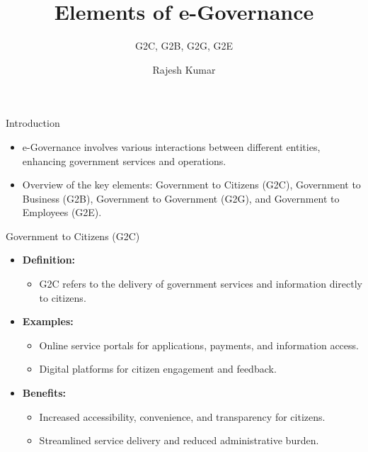 \title{Elements of e-Governance}
\subtitle{G2C, G2B, G2G, G2E}
\author{Rajesh Kumar}
\date{}


\begin{frame}
  \titlepage
\end{frame}

\begin{frame}{Introduction}
  \begin{itemize}
    \item e-Governance involves various interactions between different entities, enhancing government services and operations.
    \item Overview of the key elements: Government to Citizens (G2C), Government to Business (G2B), Government to Government (G2G), and Government to Employees (G2E).
  \end{itemize}
\end{frame}

\begin{frame}{Government to Citizens (G2C)}
  \begin{itemize}
    \item \textbf{Definition:}
      \begin{itemize}
        \item G2C refers to the delivery of government services and information directly to citizens.
      \end{itemize}
    \item \textbf{Examples:}
      \begin{itemize}
        \item Online service portals for applications, payments, and information access.
        \item Digital platforms for citizen engagement and feedback.
      \end{itemize}
    \item \textbf{Benefits:}
      \begin{itemize}
        \item Increased accessibility, convenience, and transparency for citizens.
        \item Streamlined service delivery and reduced administrative burden.
      \end{itemize}
  \end{itemize}
\end{frame}

